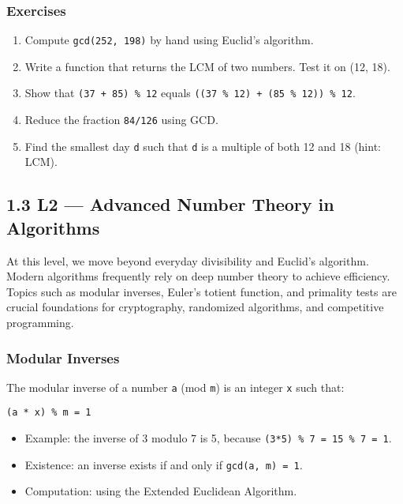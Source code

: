 \documentclass[
  letterpaper,
  DIV=11,
  numbers=noendperiod]{scrreprt}
\providecommand{\tightlist}{%
  \setlength{\itemsep}{0pt}\setlength{\parskip}{0pt}}
\begin{document}
\subsubsection{Exercises}\label{exercises-7}

\begin{enumerate}
\def\labelenumi{\arabic{enumi}.}
\tightlist
\item
  Compute \texttt{gcd(252,\ 198)} by hand using Euclid's algorithm.
\item
  Write a function that returns the LCM of two numbers. Test it on (12,
  18).
\item
  Show that \texttt{(37\ +\ 85)\ \%\ 12} equals
  \texttt{((37\ \%\ 12)\ +\ (85\ \%\ 12))\ \%\ 12}.
\item
  Reduce the fraction \texttt{84/126} using GCD.
\item
  Find the smallest day \texttt{d} such that \texttt{d} is a multiple of
  both 12 and 18 (hint: LCM).
\end{enumerate}

\subsection{1.3 L2 --- Advanced Number Theory in
Algorithms}\label{l2-advanced-number-theory-in-algorithms}

At this level, we move beyond everyday divisibility and Euclid's
algorithm. Modern algorithms frequently rely on deep number theory to
achieve efficiency. Topics such as modular inverses, Euler's totient
function, and primality tests are crucial foundations for cryptography,
randomized algorithms, and competitive programming.

\subsubsection{Modular Inverses}\label{modular-inverses}

The modular inverse of a number \texttt{a} (mod \texttt{m}) is an
integer \texttt{x} such that:

\begin{verbatim}
(a * x) % m = 1
\end{verbatim}

\begin{itemize}
\tightlist
\item
  Example: the inverse of 3 modulo 7 is 5, because
  \texttt{(3*5)\ \%\ 7\ =\ 15\ \%\ 7\ =\ 1}.
\item
  Existence: an inverse exists if and only if \texttt{gcd(a,\ m)\ =\ 1}.
\item
  Computation: using the Extended Euclidean Algorithm.
\end{itemize}
\end{document}
